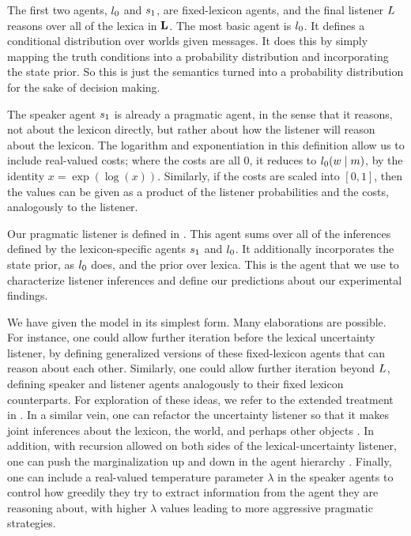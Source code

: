 \documentclass[leqno]{article}
\begin{document}
The first two agents, $l_{0}$ and $s_{1}$, are
fixed-lexicon agents, and the final listener $L$
reasons over all of the lexica in $\mathbf{L}$.  The most basic agent is
$l_{0}$. It defines a conditional distribution over worlds
given messages. It does this by simply mapping the truth conditions
into a probability distribution and incorporating the state prior. So
this is just the semantics turned into a probability distribution for
the sake of decision making.

The speaker agent $s_{1}$ is already a pragmatic agent, in the
sense that it reasons, not about the lexicon directly, but rather
about how the listener will reason about the lexicon. The logarithm
and exponentiation in this definition allow us to include real-valued
costs; where the costs are all $0$, it reduces to
$l_{0}(w \mid m)$, by the identity $x =
\exp(\log(x))$.  Similarly, if the costs are scaled into $[0,1]$, then
the values can be given as a product of the listener probabilities and
the costs, analogously to the listener.

Our pragmatic listener is defined in . This agent
sums over all of the inferences defined by the lexicon-specific agents
$s_{1}$ and $l_{0}$. It additionally incorporates the
state prior, as $l_{0}$ does, and the prior over lexica.  This
is the agent that we use to characterize listener inferences and
define our predictions about our experimental findings.

We have given the model in its simplest form. Many elaborations are
possible. For instance, one could allow further iteration before the
lexical uncertainty listener, by defining generalized versions of
these fixed-lexicon agents that can reason about each
other. Similarly, one could allow further iteration beyond
$L$, defining speaker and listener agents
analogously to their fixed lexicon counterparts.  For exploration of
these ideas, we refer to the extended treatment in
\citealt{Bergen:Levy:Goodman:2014}. In a similar vein, one can
refactor the uncertainty listener so that it makes joint inferences
about the lexicon, the world, and perhaps other objects
\citep{Smith:Goodman:Frank:2013, Kao-etal:2014}. In addition, with
recursion allowed on both sides of the lexical-uncertainty listener,
one can push the marginalization up and down in the agent hierarchy
\citep{Goodman:Lassiter:2013}. Finally, one can include a real-valued
temperature parameter $\lambda$ in the speaker agents to control how
greedily they try to extract information from the agent they are
reasoning about, with higher $\lambda$ values leading to more
aggressive pragmatic strategies. 
\end{document}
